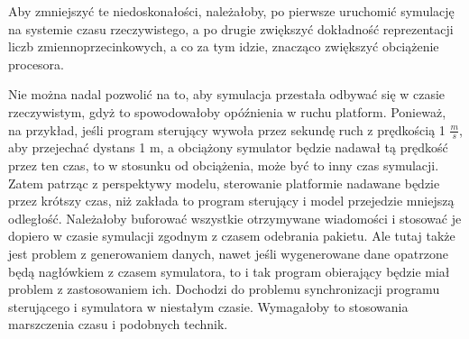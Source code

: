 		Aby zmniejszyć te niedoskonałości, należałoby, po pierwsze uruchomić symulację na systemie czasu rzeczywistego, a po drugie zwiększyć 
		dokładność reprezentacji liczb zmiennoprzecinkowych, a co za tym idzie, znacząco zwiększyć obciążenie procesora.
		
		Nie można nadal pozwolić na to, aby symulacja przestała odbywać się w czasie rzeczywistym, gdyż to spowodowałoby opóźnienia w ruchu platform.
		Ponieważ, na przykład, jeśli program sterujący wywoła przez sekundę ruch z prędkością 1 $\frac{m}{s}$, aby przejechać dystans 1 m,
		a obciążony symulator będzie nadawał tą prędkość przez ten czas, to w stosunku od obciążenia, może być to inny czas symulacji.
		Zatem patrząc z perspektywy modelu, sterowanie platformie nadawane będzie przez krótszy czas, niż zakłada to program sterujący i model przejedzie mniejszą odległość.
		Należałoby buforować wszystkie otrzymywane wiadomości i stosować je dopiero w czasie symulacji zgodnym z czasem odebrania pakietu. 
		Ale tutaj także jest problem z generowaniem danych, nawet jeśli wygenerowane dane opatrzone będą nagłówkiem z czasem symulatora, to i tak program obierający będzie miał
		problem z zastosowaniem ich. Dochodzi do problemu synchronizacji programu sterującego i symulatora w niestałym czasie. 
		Wymagałoby to stosowania marszczenia czasu i podobnych technik.
